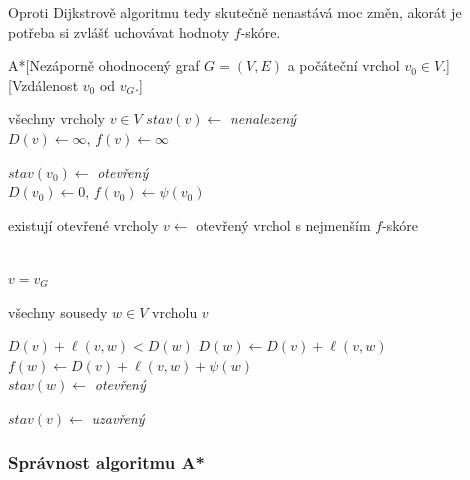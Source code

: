 Oproti Dijkstrově algoritmu tedy skutečně nenastává moc změn, akorát je potřeba si zvlášť uchovávat hodnoty $f$-skóre.
\begin{pseudo}{A*}[Nezáporně ohodnocený graf $G=(V,E)$ a počáteční vrchol $v_0\in V$.][Vzdálenost $v_0$ od $v_G$.]
    \begin{For}{všechny vrcholy $v\in V$}
        $stav(v)\gets$ \textit{nenalezený}\\
        $D(v)\gets\infty,\,f(v)\gets\infty$\\
    \end{For}
    $stav(v_0)\gets$ \textit{otevřený}\\
    $D(v_0)\gets 0,\,f(v_0)\gets\psi(v_0)$\\
    \begin{While}{existují otevřené vrcholy}
        $v\gets$ otevřený vrchol s nejmenším $f$-skóre\\\\
        \begin{If}{$v=v_G$}
            \\
        \end{If}
        \begin{For}{všechny sousedy $w\in V$ vrcholu $v$}
            \begin{If}{$D(v)+\ell(v,w)<D(w)$}
                $D(w)\gets D(v)+\ell(v,w)$\\
                $f(w)\gets D(v)+\ell(v,w)+\psi(w)$\\
                $stav(w)\gets$ \textit{otevřený}
            \end{If}
        \end{For}
        $stav(v)\gets$ \textit{uzavřený}
    \end{While}
\end{pseudo}

\subsubsection{Správnost algoritmu A*}


